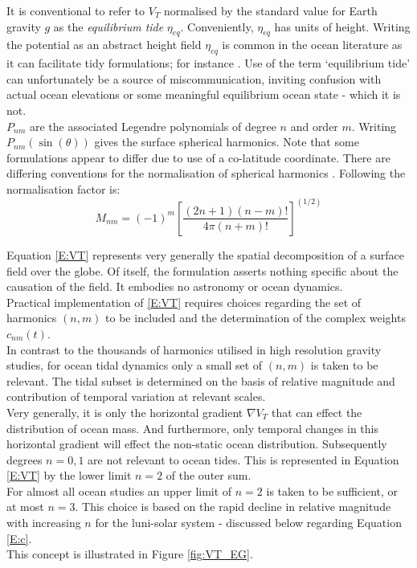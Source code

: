 It is conventional to refer to $V_T$ normalised by the standard value for Earth gravity $g$ as the \emph{equilibrium tide} $\eta_{eq}$.  Conveniently, $\eta_{eq}$ has units of height.  Writing the potential as an abstract height field $\eta_{eq}$ is common in the ocean literature as it can facilitate tidy formulations; for instance \cite[Eq 9.8.3]{gill1982atmosphere}.   Use of the term `equilibrium tide' can unfortunately be a source of miscommunication, inviting confusion with actual ocean elevations or some meaningful equilibrium ocean state - which it is not.\\

$P_{nm}$ are the associated Legendre polynomials of degree $n$ and order $m$.  Writing $P_{nm}( \sin(\theta) )$ gives the surface spherical harmonics.   Note that some formulations appear to differ due to use of a co-latitude coordinate.   There are differing conventions for the normalisation of spherical harmonics \citep[sec 6.5]{Anonymous:2004tm}. Following \CTE{} the normalisation factor is:
\begin{equation}
\label{E:M}
M_{nm} = (-1)^m \left [ \frac{(2n+1)(n-m)!}{ 4 \pi (n+m)!} \right ]^{(1/2)}
\end{equation}

Equation \ref{E:VT} represents very generally the spatial decomposition of a surface field over the globe.  Of itself, the formulation asserts nothing specific about the causation of the field.  It embodies no astronomy or ocean dynamics.\\
Practical implementation of \ref{E:VT} requires choices regarding the set of harmonics $(n,m)$ to be included and the determination of the complex weights $c_{nm}(t)$.\\
In contrast to the thousands of harmonics utilised in high resolution gravity studies, for ocean tidal dynamics only a small set of $(n,m)$ is taken to be relevant.   The tidal subset is determined on the basis of relative magnitude and contribution of temporal variation at relevant scales.\\
Very generally, it is only the horizontal gradient $\nabla V_T$ that can effect the distribution of ocean mass.  And furthermore, only temporal changes in this horizontal gradient will effect the non-static ocean distribution. Subsequently degrees $n=0,1$ are not relevant to ocean tides.   This is represented in Equation \ref{E:VT} by the lower limit $n=2$ of the outer sum.\\
For almost all ocean studies an upper limit of $n=2$ is taken to be sufficient, or at most $n=3$.  This choice is based on the rapid decline in relative magnitude with increasing $n$ for the luni-solar system - discussed below regarding Equation \ref{E:c}.\\
This concept is illustrated in Figure \ref{fig:VT_EG}.


